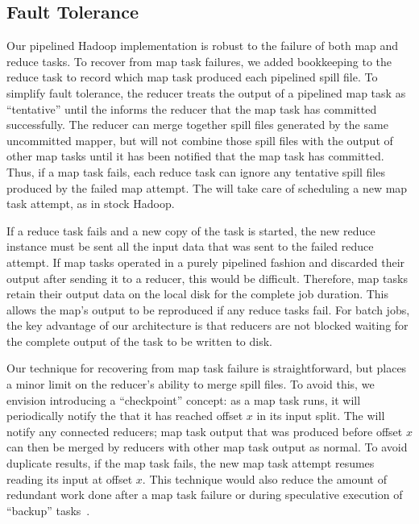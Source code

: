 \subsection{Fault Tolerance}
\label{ch:hop:sec:ft}


Our pipelined Hadoop implementation is robust to the failure of both
map and reduce tasks. To recover from map task failures, we added
bookkeeping to the reduce task to record which map task produced each
pipelined spill file. To simplify fault tolerance, the reducer treats
the output of a pipelined map task as ``tentative'' until the {\JT}
informs the reducer that the map task has committed successfully. The
reducer can merge together spill files generated by the same
uncommitted mapper, but will not combine those spill files with the
output of other map tasks until it has been notified that the map task
has committed. Thus, if a map task fails, each reduce task can ignore
any tentative spill files produced by the failed map attempt. The
{\JT} will take care of scheduling a new map task attempt, as in stock
Hadoop. 

If a reduce task fails and a new copy of the task is started, the new
reduce instance must be sent all the input data that was sent to the
failed reduce attempt. If map tasks operated in a purely pipelined
fashion and discarded their output after sending it to a reducer, this
would be difficult. Therefore, map tasks retain their output data on
the local disk for the complete job duration. This allows the map's output to be 
reproduced if any reduce tasks fail. For batch jobs, the key advantage of our architecture is
that reducers are not blocked waiting for the complete output of the
task to be written to disk.

Our technique for recovering from map task failure is straightforward, but
places a minor limit on the reducer's ability to merge spill files. To avoid
this, we envision introducing a ``checkpoint'' concept: as a map task runs, it
will periodically notify the {\JT} that it has reached offset $x$ in its input
split. The {\JT} will notify any connected reducers; map task output that was
produced before offset $x$ can then be merged by reducers with other map task
output as normal. To avoid duplicate results, if the map task fails, the new map
task attempt resumes reading its input at offset $x$. This technique would also
reduce the amount of redundant work done after a map task failure or during
speculative execution of ``backup'' tasks~\cite{mapreduce-osdi}.

